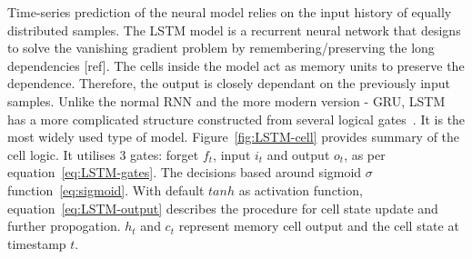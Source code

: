Time-series prediction of the neural model relies on the input history of equally distributed samples.
The LSTM model is a recurrent neural network that designs to solve the vanishing gradient problem by remembering/preserving the long dependencies [ref].
The cells inside the model act as memory units to preserve the dependence.
Therefore, the output is closely dependant on the previously input samples.
Unlike the normal RNN and the more modern version - GRU, LSTM has a more complicated structure constructed from several logical gates~\cite{LSTM_Hochreiter1997}.
It is the most widely used type of model.
Figure~\ref{fig:LSTM-cell} provides summary of the cell logic.
It utilises 3 gates: forget $f_t$, input $i_t$ and output $o_t$, as per equation~\ref{eq:LSTM-gates}.
The decisions based around sigmoid $\sigma$ function~\ref{eq:sigmoid}.
With default $tanh$ as activation function, equation~\ref{eq:LSTM-output} describes the procedure for cell state update and further propogation.
$h_t$ and $c_t$ represent memory cell output and the cell state at timestamp $t$.

